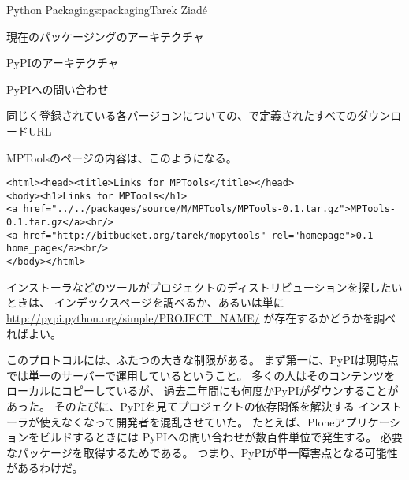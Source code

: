 \begin{aosachapter}{Python Packaging}{s:packaging}{Tarek Ziad\'{e}}
\begin{aosasect1}{現在のパッケージングのアーキテクチャ}
\begin{aosasect2}{PyPIのアーキテクチャ}
\begin{aosasect3}{PyPIへの問い合わせ}
\begin{aosaitemize}
  \item 同じく登録されている各バージョンについての、で定義されたすべてのダウンロードURL

\end{aosaitemize}

\noindent
MPToolsのページの内容は、このようになる。

\begin{verbatim}
<html><head><title>Links for MPTools</title></head>
<body><h1>Links for MPTools</h1>
<a href="../../packages/source/M/MPTools/MPTools-0.1.tar.gz">MPTools-0.1.tar.gz</a><br/>
<a href="http://bitbucket.org/tarek/mopytools" rel="homepage">0.1 home_page</a><br/>
</body></html>
\end{verbatim}

\noindent
インストーラなどのツールがプロジェクトのディストリビューションを探したいときは、
インデックスページを調べるか、あるいは単に\url{http://pypi.python.org/simple/PROJECT_NAME/}
が存在するかどうかを調べればよい。

このプロトコルには、ふたつの大きな制限がある。
まず第一に、PyPIは現時点では単一のサーバーで運用しているということ。
多くの人はそのコンテンツをローカルにコピーしているが、
過去二年間にも何度かPyPIがダウンすることがあった。
そのたびに、PyPIを見てプロジェクトの依存関係を解決する
インストーラが使えなくなって開発者を混乱させていた。
たとえば、Ploneアプリケーションをビルドするときには
PyPIへの問い合わせが数百件単位で発生する。
必要なパッケージを取得するためである。
つまり、PyPIが単一障害点となる可能性があるわけだ。


\end{aosasect3}
\end{aosasect2}
\end{aosasect1}
\end{aosachapter}
